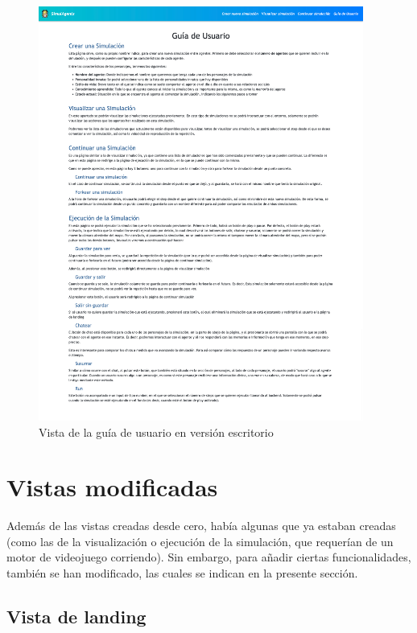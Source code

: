  \begin{figure}[H]
	\centering
	\includegraphics[width = 0.95\textwidth]{Imagenes/Vectorial/vistaGuiaUsuario.png}
	\caption{Vista de la guía de usuario en versión escritorio}
	\label{fig:vistaGuiaUsuario}
\end{figure}

\section{Vistas modificadas}

Además de las vistas creadas desde cero, había algunas que ya estaban creadas (como las de la visualización o ejecución de la simulación, que requerían de un motor de videojuego corriendo). Sin embargo, para añadir ciertas funcionalidades, también se han modificado, las cuales se indican en la presente sección.

\subsection{Vista de landing}

